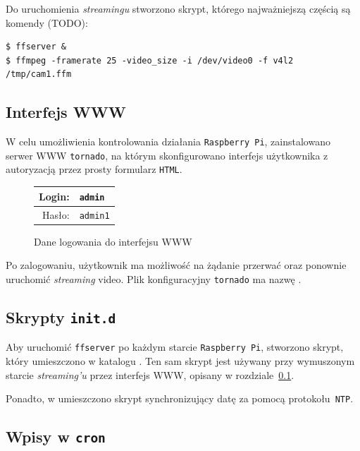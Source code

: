 \documentclass{article}
\begin{document}
Do uruchomienia \emph{streamingu} stworzono skrypt, którego najważniejszą częścią są komendy (TODO):
\begin{verbatim}
$ ffserver &
$ ffmpeg -framerate 25 -video_size -i /dev/video0 -f v4l2 /tmp/cam1.ffm
\end{verbatim}


\subsection{Interfejs WWW}
\label{sec:www}

W celu umożliwienia kontrolowania działania \texttt{Raspberry~Pi}, zainstalowano serwer WWW \texttt{tornado}, na którym skonfigurowano interfejs użytkownika z autoryzacją przez prosty formularz \texttt{HTML}.
\begin{figure}[H]
\centering
\begin{tabular}{r|l}
Login: & \texttt{admin}\\
\hline
Hasło: & \texttt{admin1}\\
\end{tabular}
\caption{Dane logowania do interfejsu WWW}
\end{figure}
Po zalogowaniu, użytkownik ma możliwość na żądanie przerwać oraz ponownie uruchomić \emph{streaming} video. Plik konfiguracyjny \texttt{tornado} ma nazwę .


\subsection{Skrypty \texttt{init.d}}

Aby uruchomić \texttt{ffserver} po każdym starcie \texttt{Raspberry~Pi}, stworzono skrypt, który umieszczono w katalogu . Ten sam skrypt jest używany przy wymuszonym starcie \emph{streaming'u} przez interfejs WWW, opisany w rozdziale~\ref{sec:www}.

Ponadto, w  umieszczono skrypt synchronizujący datę za pomocą protokołu~\texttt{NTP}.


\subsection{Wpisy w \texttt{cron}}
\end{document}
